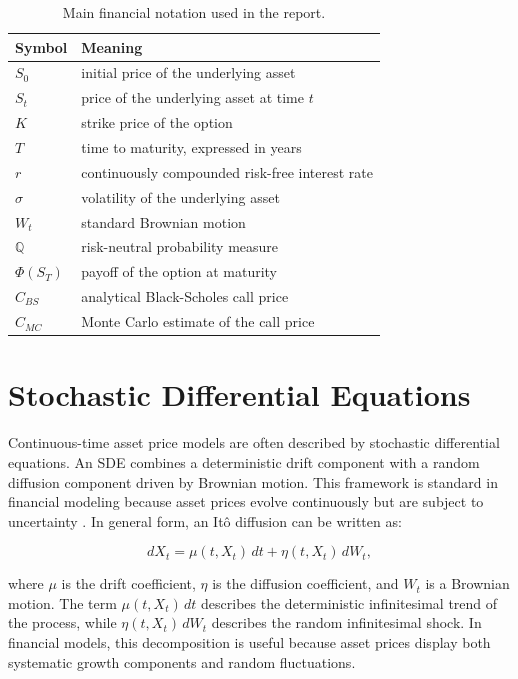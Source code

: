 \begin{table}[H]
    \centering
    \begin{tabular}{ll}
        \toprule
        Symbol & Meaning \\
        \midrule
        $S_0$ & initial price of the underlying asset \\
        $S_t$ & price of the underlying asset at time $t$ \\
        $K$ & strike price of the option \\
        $T$ & time to maturity, expressed in years \\
        $r$ & continuously compounded risk-free interest rate \\
        $\sigma$ & volatility of the underlying asset \\
        $W_t$ & standard Brownian motion \\
        $\mathbb{Q}$ & risk-neutral probability measure \\
        $\Phi(S_T)$ & payoff of the option at maturity \\
        $C_{BS}$ & analytical Black-Scholes call price \\
        $\hat{C}_{MC}$ & Monte Carlo estimate of the call price \\
        \bottomrule
    \end{tabular}
    \caption{Main financial notation used in the report.}
    \label{tab:financial-notation}
\end{table}

\section{Stochastic Differential Equations}

Continuous-time asset price models are often described by stochastic differential equations.
An SDE combines a deterministic drift component with a random diffusion component driven by Brownian motion.
This framework is standard in financial modeling because asset prices evolve continuously but are subject to uncertainty \cite{shreve2004stochastic}.
In general form, an Itô diffusion can be written as:

\begin{equation}
    dX_t = \mu(t, X_t)\,dt + \eta(t, X_t)\,dW_t,
\end{equation}

where $\mu$ is the drift coefficient, $\eta$ is the diffusion coefficient, and $W_t$ is a Brownian motion.
The term $\mu(t, X_t)\,dt$ describes the deterministic infinitesimal trend of the process, while $\eta(t, X_t)\,dW_t$ describes the random infinitesimal shock.
In financial models, this decomposition is useful because asset prices display both systematic growth components and random fluctuations.

